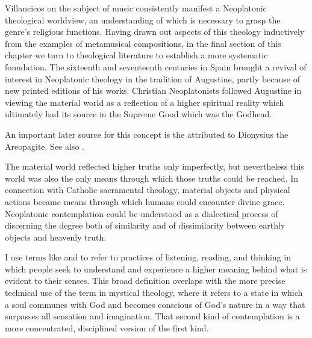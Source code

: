 Villancicos on the subject of music consistently manifest a Neoplatonic
theological worldview, an understanding of which is necessary to grasp the
genre's religious functions.
Having drawn out aspects of this theology inductively from the examples of
metamusical compositions, in the final section of this chapter we turn to
theological literature to establish a more systematic foundation.
The sixteenth and seventeenth centuries in Spain brought a revival of interest
in Neoplatonic theology in the tradition of Augustine, partly because of new
printed editions of his works.%
    \Autocite{Weber:ReligiousLitSpain}
Christian Neoplatonists followed Augustine in viewing the material
world as a reflection of a higher spiritual reality which ultimately had its
source in the Supreme Good which was the Godhead.%
\begin{Footnote}
    An important later source for this concept is the  attributed to Dionysius the Areopagite.
    See also \autocite{Knighton:Mysticism}.
\end{Footnote}
The material world reflected higher truths only imperfectly, but nevertheless
this world was also the only means through which those truths could be reached.
In connection with Catholic sacramental theology, material objects and physical
actions became means through which humans could encounter divine grace.
Neoplatonic contemplation could be understood as a dialectical process of
discerning the degree both of similarity and of dissimilarity between earthly
objects and heavenly truth.%
\begin{Footnote}
    I use terms like  and  to
    refer to practices of listening, reading, and thinking in which people 
    seek to understand and experience a higher meaning behind what is evident
    to their senses. 
    This broad definition overlaps with the more precise technical use of
    the term  in mystical theology, where it refers to
    a state in which a soul communes with God and becomes conscious of God's
    nature in a way that surpasses all sensation and imagination.
    That second kind of contemplation is a more concentrated, disciplined
    version of the first kind.
\end{Footnote}


